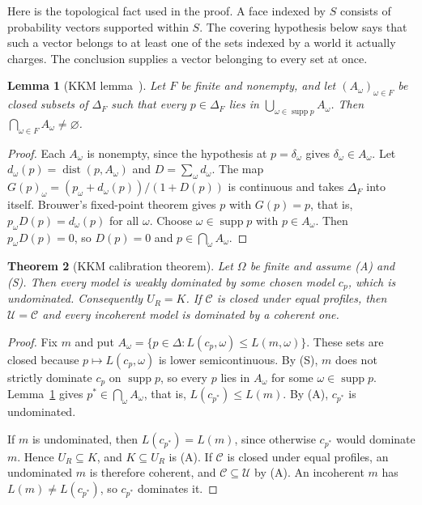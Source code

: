\documentclass[11pt]{article}
\newtheorem{theorem}{Theorem}[section]
\newtheorem{lemma}[theorem]{Lemma}
\theoremstyle{definition}
\theoremstyle{remark}
\newcommand{\C}{\mathcal C}
\newcommand{\U}{\mathcal U}
\newcommand{\supp}{\operatorname{supp}}
\begin{document}
Here is the topological fact used in the proof. A face indexed by $S$ consists of probability vectors supported within $S$. The covering hypothesis below says that such a vector belongs to at least one of the sets indexed by a world it actually charges. The conclusion supplies a vector belonging to every set at once.
\begin{lemma}[KKM lemma~\cite{KKM}]\label{lem:kkm}
Let $F$ be finite and nonempty, and let $(A_\omega)_{\omega\in F}$ be closed subsets of $\Delta_F$ such that every $p\in\Delta_F$ lies in $\bigcup_{\omega\in\supp p}A_\omega$. Then $\bigcap_{\omega\in F}A_\omega\ne\varnothing$.
\end{lemma}
\begin{proof}
Each $A_\omega$ is nonempty, since the hypothesis at $p=\delta_\omega$ gives $\delta_\omega\in A_\omega$. Let $d_\omega(p)=\operatorname{dist}(p,A_\omega)$ and $D=\sum_\omega d_\omega$. The map $G(p)_\omega=(p_\omega+d_\omega(p))/(1+D(p))$ is continuous and takes $\Delta_F$ into itself. Brouwer's fixed-point theorem gives $p$ with $G(p)=p$, that is, $p_\omega D(p)=d_\omega(p)$ for all $\omega$. Choose $\omega\in\supp p$ with $p\in A_\omega$. Then $p_\omega D(p)=0$, so $D(p)=0$ and $p\in\bigcap_\omega A_\omega$.
\end{proof}
\begin{theorem}[KKM calibration theorem]\label{thm:kkm}
Let $\Omega$ be finite and assume (A) and (S). Then every model is weakly dominated by some chosen model $c_p$, which is undominated. Consequently $U_R=K$. If $\C$ is closed under equal profiles, then $\U=\C$ and every incoherent model is dominated by a coherent one.
\end{theorem}
\begin{proof}
Fix $m$ and put $A_\omega=\{p\in\Delta:L(c_p,\omega)\le L(m,\omega)\}$. These sets are closed because $p\mapsto L(c_p,\omega)$ is lower semicontinuous. By (S), $m$ does not strictly dominate $c_p$ on $\supp p$, so every $p$ lies in $A_\omega$ for some $\omega\in\supp p$. Lemma~\ref{lem:kkm} gives $p^*\in\bigcap_\omega A_\omega$, that is, $L(c_{p^*})\le L(m)$. By (A), $c_{p^*}$ is undominated.

If $m$ is undominated, then $L(c_{p^*})=L(m)$, since otherwise $c_{p^*}$ would dominate $m$. Hence $U_R\subseteq K$, and $K\subseteq U_R$ is (A). If $\C$ is closed under equal profiles, an undominated $m$ is therefore coherent, and $\C\subseteq\U$ by (A). An incoherent $m$ has $L(m)\ne L(c_{p^*})$, so $c_{p^*}$ dominates it.
\end{proof}
\end{document}
